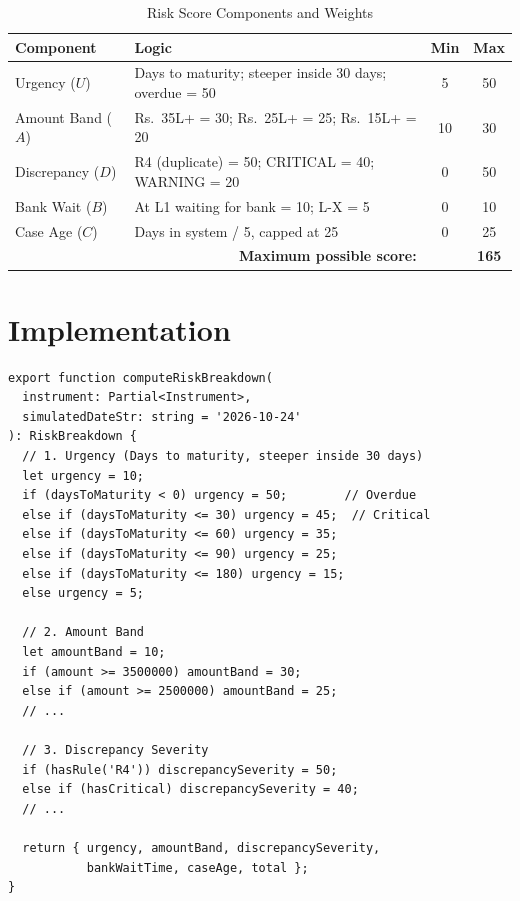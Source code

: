 \documentclass[12pt, a4paper]{report}
\newcommand{\rupee}{Rs.~}
\begin{document}
\begin{table}[H]
\centering
\caption{Risk Score Components and Weights}
\label{tab:risk-weights}
\begin{tabular}{|l|l|c|c|}
\hline
\textbf{Component} & \textbf{Logic} & \textbf{Min} & \textbf{Max} \\
\hline
Urgency ($U$) & Days to maturity; steeper inside 30 days; overdue = 50 & 5 & 50 \\
\hline
Amount Band ($A$) & \rupee 35L+ = 30; \rupee 25L+ = 25; \rupee 15L+ = 20 & 10 & 30 \\
\hline
Discrepancy ($D$) & R4 (duplicate) = 50; CRITICAL = 40; WARNING = 20 & 0 & 50 \\
\hline
Bank Wait ($B$) & At L1 waiting for bank = 10; L-X = 5 & 0 & 10 \\
\hline
Case Age ($C$) & Days in system / 5, capped at 25 & 0 & 25 \\
\hline
\multicolumn{2}{|r|}{\textbf{Maximum possible score:}} & & \textbf{165} \\
\hline
\end{tabular}
\end{table}

\section{Implementation}

\begin{lstlisting}[caption={Risk Scoring Engine (riskScorer.ts)}, label={lst:risk}]
export function computeRiskBreakdown(
  instrument: Partial<Instrument>,
  simulatedDateStr: string = '2026-10-24'
): RiskBreakdown {
  // 1. Urgency (Days to maturity, steeper inside 30 days)
  let urgency = 10;
  if (daysToMaturity < 0) urgency = 50;        // Overdue
  else if (daysToMaturity <= 30) urgency = 45;  // Critical
  else if (daysToMaturity <= 60) urgency = 35;
  else if (daysToMaturity <= 90) urgency = 25;
  else if (daysToMaturity <= 180) urgency = 15;
  else urgency = 5;

  // 2. Amount Band
  let amountBand = 10;
  if (amount >= 3500000) amountBand = 30;
  else if (amount >= 2500000) amountBand = 25;
  // ...

  // 3. Discrepancy Severity
  if (hasRule('R4')) discrepancySeverity = 50;
  else if (hasCritical) discrepancySeverity = 40;
  // ...

  return { urgency, amountBand, discrepancySeverity,
           bankWaitTime, caseAge, total };
}
\end{lstlisting}
\end{document}

